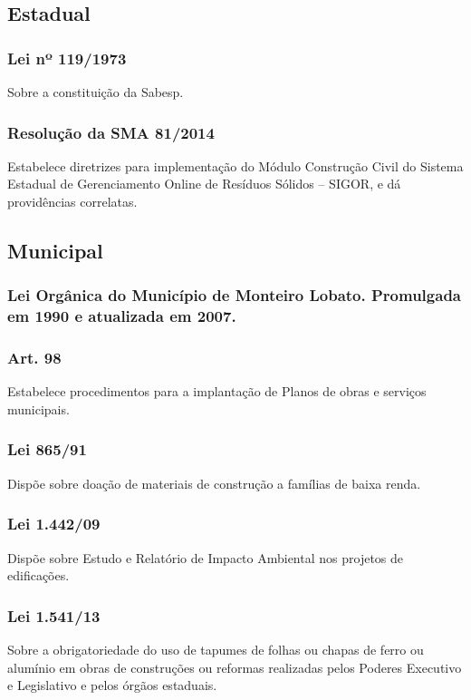 \begin{subapend}
	\subsection{Estadual}
	\begin{subsubapend}
		\subsubsection{Lei nº 119/1973}
		Sobre a constituição da Sabesp.
		\subsubsection{Resolução da SMA 81/2014}
		Estabelece diretrizes para implementação do Módulo Construção Civil do Sistema Estadual de Gerenciamento Online de Resíduos Sólidos – SIGOR, e dá providências correlatas.
		\subsection{Municipal}
		\subsubsection{Lei Orgânica do Município de Monteiro Lobato. Promulgada em 1990 e atualizada em 2007.}
		\subsubsection{Art. 98}
		Estabelece procedimentos para a implantação de Planos de obras e serviços municipais.
		\subsubsection{Lei 865/91}
		Dispõe sobre doação de materiais de construção a famílias de baixa renda.
		\subsubsection{Lei 1.442/09}
		Dispõe sobre Estudo e Relatório de Impacto Ambiental nos projetos de edificações.
		\subsubsection{Lei 1.541/13}
		Sobre a obrigatoriedade do uso de tapumes de folhas ou chapas de ferro ou alumínio em obras de construções ou reformas realizadas pelos Poderes Executivo e Legislativo e pelos órgãos estaduais.
	\end{subsubapend}
\end{subapend}




